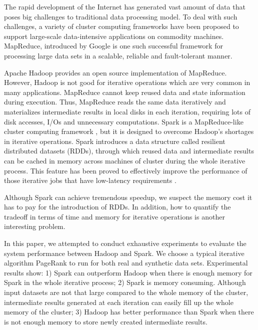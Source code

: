 \documentclass[10pt,conference,compsocconf]{IEEEtran}
\begin{document}
The rapid development of the Internet has generated vast amount of data that poses big challenges to traditional data processing model. To deal with such challenges, a variety of cluster computing frameworks have been proposed to support large-scale data-intensive applications on commodity machines. MapReduce, introduced by Google\cite{jdean2004} is one such successful framework for processing large data sets in a scalable, reliable and fault-tolerant manner. 

Apache Hadoop\cite{url_hadoop} provides an open source implementation of MapReduce.
However, Hadoop is not good for iterative operations which are very common in many applications. MapReduce cannot keep reused data and state information during execution. Thus, MapReduce reads the same data iteratively and materializes intermediate results in local disks in each iteration, requiring lots of disk accesses, I/Os and unnecessary computations. Spark is a MapReduce-like cluster computing framework \cite{url_spark, matei2010}, but it is designed to overcome Hadoop's shortages in iterative operations. Spark introduces a data structure called resilient distributed datasets (RDDs)\cite{matei2012}, through which reused data and intermediate results can be cached in memory across machines of cluster during the whole iterative process. This feature has been proved to effectively improve the performance of those iterative jobs that have low-latency requirements \cite{matei2012}.


Although Spark can achieve tremendous speedup, we suspect the memory cost it has to pay for the introduction of RDDs.  In addition, how to quantify the tradeoff in terms of time and memory for iterative operations is another interesting problem. %

In this paper, we attempted to conduct exhaustive experiments to evaluate the system performance between Hadoop and Spark. We choose a typical iterative algorithm PageRank \cite{page1999} to run for both real and synthetic data sets. Experimental results show: 1) Spark can outperform Hadoop when there is enough memory for Spark in the whole iterative process; 2) Spark is memory consuming. Although input datasets are not that large compared to the whole memory of the cluster, intermediate results generated at each iteration can easily fill up the whole memory of the cluster; 3) Hadoop has better performance than Spark when there is not enough memory to store newly created intermediate results.
\end{document}
